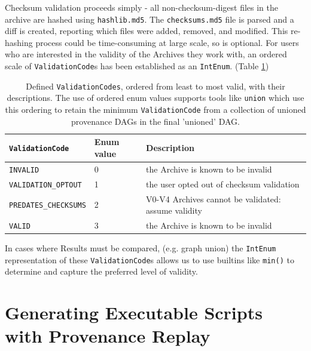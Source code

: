 Checksum validation proceeds simply - all non-checksum-digest files in the
archive are hashed using \texttt{hashlib.md5}. The \texttt{checksums.md5} file is parsed and a
diff is created, reporting which files were added, removed, and modified. This
re-hashing process could be time-consuming at large scale, so is optional. For
users who are interested in the validity of the Archives they work with, an
ordered scale of \texttt{ValidationCode}s has been established as an \texttt{IntEnum}. (Table \ref{tab:validationCodes})

\begin{table}[htp]
    \centering
    \begin{tabular}{|p{}|p{}|p{}|}
    \hline
    \texttt{ValidationCode}      & Enum value & Description                                          \\ \hline
    \texttt{INVALID}             & 0          & the Archive is known to be invalid                   \\
    \texttt{VALIDATION\_OPTOUT}  & 1          & the user opted out of checksum validation            \\
    \texttt{PREDATES\_CHECKSUMS} & 2          & V0-V4 Archives cannot be validated: assume validity  \\
    \texttt{VALID}               & 3          & the Archive is known to be invalid                   \\ \hline
    \end{tabular}
    \caption[Defined ValidationCodes, ordered from least to most valid, with their descriptions]%
    {Defined \texttt{ValidationCodes}, ordered from least to most valid, with their descriptions.
    The use of ordered enum values supports tools like \texttt{union} which use this ordering
    to retain the minimum \texttt{ValidationCode} from a collection of unioned provenance DAGs
    in the final 'unioned' DAG.}
    \label{tab:validationCodes}
\end{table}

\noindent In cases where Results must be compared, (e.g. graph union) the \texttt{IntEnum}
representation of these \texttt{ValidationCode}s allows us to use builtins like \texttt{min()} to
determine and capture the preferred level of validity.


\section{Generating Executable Scripts with Provenance Replay}

